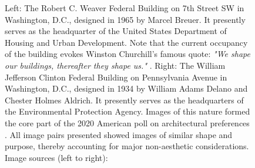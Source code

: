 \documentclass{article}
\begin{document}
\begin{figure}[ht!]
    \centering
    \caption{Left: The Robert C. Weaver Federal Building on 7th Street SW in Washington, D.C., designed in 1965 by Marcel Breuer. It presently serves as the headquarter of the United States Department of Housing and Urban Development. Note that the current occupancy of the building evokes Winston Churchill's famous quote: \textit{"We shape our buildings, thereafter they shape us."} \cite{noauthor_churchill_nodate}. Right: The William Jefferson Clinton Federal Building on Pennsylvania Avenue in Washington, D.C., designed in 1934 by William Adams Delano and Chester Holmes Aldrich. It presently serves as the headquarters of the Environmental Protection Agency. Images of this nature formed the core part of the 2020 American poll on architectural preferences \cite{noauthor_americans_2020}. All image pairs presented showed images of similar shape and purpose, thereby accounting for major non-aesthetic considerations. \newline Image sources (left to right): \cite{highsmith_robert_2012}\cite{wikimedia_commons_user_moreau1_epa_2018}}
    \label{fig:federal_buildings}
\end{figure}
\end{document}

